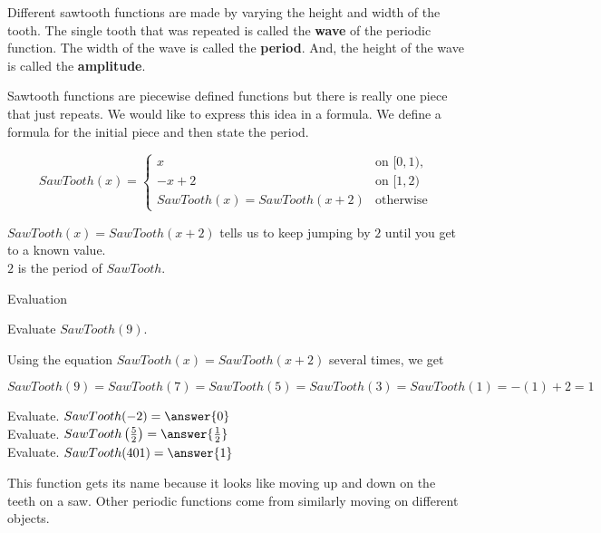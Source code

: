 \documentclass{ximera}
\begin{document}
Different sawtooth functions are made by varying the height and width of the tooth.  The single tooth that was repeated is called the \textbf{wave} of the periodic function.  The width of the wave is called the \textbf{period}. And, the height of the wave is called the \textbf{amplitude}.




Sawtooth functions are piecewise defined functions but there is really one piece that just repeats.  We would like to express this idea in a formula. We define a formula for the initial piece and then state the period.




\[
SawTooth(x) = 
\begin{cases}
  x &\text{on $[0,1)$,} \\
  -x+2 &\text{on $[1,2)$} \\ 
  SawTooth(x) = SawTooth(x+2) & \text{otherwise}
\end{cases}
\]


$SawTooth(x) = SawTooth(x+2)$ tells us to keep jumping by $2$ until you get to a known value. \\
$2$ is the period of $SawTooth$.


\begin{example} Evaluation


Evaluate  $SawTooth(9)$. 

Using the equation $SawTooth(x) = SawTooth(x+2)$ several times, we get 


\[
SawTooth(9) = SawTooth(7) = SawTooth(5) = SawTooth(3) = SawTooth(1) = -(1) + 2 = 1
\]


\begin{question}

Evaluate.  $SawTooth(-2) = \answer{0}$ \\

Evaluate.  $SawTooth\left( \frac{5}{2} \right) = \answer{\frac{1}{2}}$ \\

Evaluate.  $SawTooth(401) = \answer{1}$

\end{question}


\end{example}








This function gets its name because it looks like moving up and down on the teeth on a saw. Other periodic functions come from similarly moving on different objects. 
\end{document}
